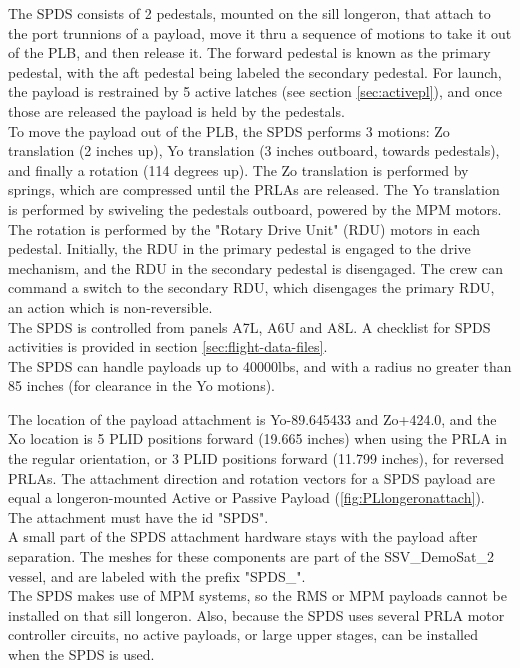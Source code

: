 \documentclass[Space_Shuttle_Vessel_Manual.tex]{subfiles}
\begin{document}
\begin{multicols*}{2}
The SPDS consists of 2 pedestals, mounted on the sill longeron, that attach to the port trunnions of a payload, move it thru a sequence of motions to take it out of the PLB, and then release it. The forward pedestal is known as the primary pedestal, with the aft pedestal being labeled the secondary pedestal. For launch, the payload is restrained by 5 active latches (see section \ref{sec:activepl}), and once those are released the payload is held by the pedestals.
\\
To move the payload out of the PLB, the SPDS performs 3 motions: Zo translation (2 inches up), Yo translation (3 inches outboard, towards pedestals), and finally a rotation (114 degrees up). The Zo translation is performed by springs, which are compressed until the PRLAs are released. The Yo translation is performed by swiveling the pedestals outboard, powered by the MPM motors. The rotation is performed by the "Rotary Drive Unit" (RDU) motors in each pedestal. Initially, the RDU in the primary pedestal is engaged to the drive mechanism, and the RDU in the secondary pedestal is disengaged. The crew can command a switch to the secondary RDU, which disengages the primary RDU, an action which is non-reversible.
\\
The SPDS is controlled from panels A7L, A6U and A8L. A checklist for SPDS activities is provided in section \ref{sec:flight-data-files}.
\\
The SPDS can handle payloads up to 40000lbs, and with a radius no greater than 85 inches (for clearance in the Yo motions). 

The location of the payload attachment is Yo-89.645433 and Zo+424.0, and the Xo location is 5 PLID positions forward (19.665 inches) when using the PRLA in the regular orientation, or 3 PLID positions forward (11.799 inches), for reversed PRLAs. The attachment direction and rotation vectors for a SPDS payload are equal a longeron-mounted Active or Passive Payload (\ref{fig:PLlongeronattach}). The attachment must have the id "SPDS".
\\
A small part of the SPDS attachment hardware stays with the payload after separation. The meshes for these components are part of the SSV\_DemoSat\_2 vessel, and are labeled with the prefix "SPDS\_".
\\
The SPDS makes use of MPM systems, so the RMS or MPM payloads cannot be installed on that sill longeron. Also, because the SPDS uses several PRLA motor controller circuits, no active payloads, or large upper stages, can be installed when the SPDS is used.



\end{multicols*}
\end{document}

